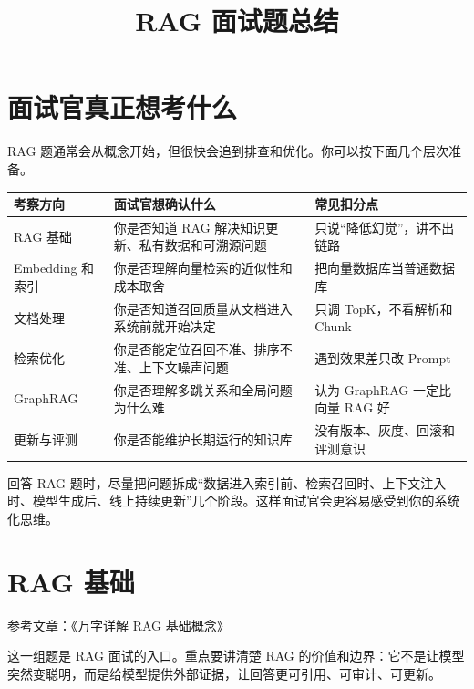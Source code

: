 \documentclass[9pt,a4paper,twocolumn]{ctexart}
\begin{document}
\title{RAG 面试题总结}
\date{}
\maketitle
{}

\section*{面试官真正想考什么}


RAG 题通常会从概念开始，但很快会追到排查和优化。你可以按下面几个层次准备。


{\footnotesize
\begin{tabular}{|p{}|p{}|p{}|}
\hline
\textbf{考察方向} & \textbf{面试官想确认什么} & \textbf{常见扣分点} \\
\hline
RAG 基础 & 你是否知道 RAG 解决知识更新、私有数据和可溯源问题 & 只说“降低幻觉”，讲不出链路 \\
\hline
Embedding 和索引 & 你是否理解向量检索的近似性和成本取舍 & 把向量数据库当普通数据库 \\
\hline
文档处理 & 你是否知道召回质量从文档进入系统前就开始决定 & 只调 TopK，不看解析和 Chunk \\
\hline
检索优化 & 你是否能定位召回不准、排序不准、上下文噪声问题 & 遇到效果差只改 Prompt \\
\hline
GraphRAG & 你是否理解多跳关系和全局问题为什么难 & 认为 GraphRAG 一定比向量 RAG 好 \\
\hline
更新与评测 & 你是否能维护长期运行的知识库 & 没有版本、灰度、回滚和评测意识 \\
\hline
\end{tabular}
}



回答 RAG 题时，尽量把问题拆成“数据进入索引前、检索召回时、上下文注入时、模型生成后、线上持续更新”几个阶段。这样面试官会更容易感受到你的系统化思维。



\section*{RAG 基础}


参考文章：《万字详解 RAG 基础概念》



这一组题是 RAG 面试的入口。重点要讲清楚 RAG 的价值和边界：它不是让模型突然变聪明，而是给模型提供外部证据，让回答更可引用、可审计、可更新。
\end{document}
